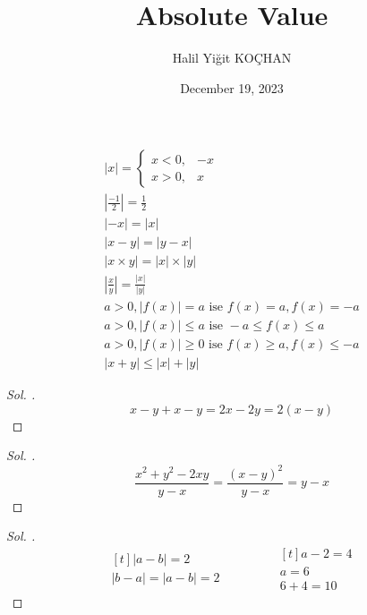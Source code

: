 \documentclass{article}
\title{Absolute Value}
\author{Halil Yiğit KOÇHAN}
\date{December 19, 2023}
\theoremstyle{mytheoremstyle}
\theoremstyle{mytheoremstyle}
\theoremstyle{myproblemstyle}
\begin{document}
    \maketitle

\begin{gather*}
  |x| =
  \begin{cases}
    x < 0, &-x\\
    x > 0, &x
  \end{cases}\\
  \left|\frac{-1}{2}\right| = \frac{1}{2}\\
  |-x| = |x|\\
  |x - y| = |y - x|\\
  |x \times y| = |x| \times |y|\\
  |\frac{x}{y}| = \frac{|x|}{|y|}\\
  a > 0, |f(x)| = a \text{ ise } f(x) = a, f(x) = -a\\
  a > 0, |f(x)| \le a \text{ ise } -a \le f(x) \le a\\
  a > 0, |f(x)| \ge 0 \text { ise } f(x) \ge a, f(x) \le -a\\
  |x + y| \le |x| + |y|
\end{gather*}

\begin{problem}[$ x > 0 $ ve $ y < 0 $ ise $ |x - y| + |x| + |y| = ? $]
\end{problem}

\begin{proof}[\textit{ Sol. }]
  $$ x - y + x - y = 2x -2y = 2(x - y) $$
\end{proof}

\begin{problem}[$ x < 0 < y $ ise $ \frac{x^2 + 2|xy| + y^2}{|y - x|} = ? $]
\end{problem}

\begin{proof}[\textit{ Sol. }]
  $$ \frac{x^2 + y^2 - 2xy}{y - x} = \frac{(x - y)^2}{y - x} = y - x $$
\end{proof}

\pagebreak
\begin{problem}[$ a, b \in {R} $, $ a - b = 2 $, $ a - |b - a| = 4 $ ise $ a + b = ? $]
\end{problem}

\begin{proof}[\textit{ Sol. }]
  \begin{equation*}
    \begin{aligned}[t]
      |a - b| = 2\\
      |b - a| = |a - b| = 2
    \end{aligned}
    \qquad\qquad
    \begin{aligned}[t]
      a - 2 = 4\\
      a = 6\\
      6 + 4 = 10
    \end{aligned}
  \end{equation*}
\end{proof}
\end{document}
